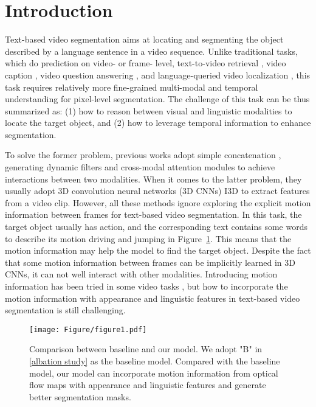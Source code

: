 \documentclass[10pt,twocolumn,letterpaper]{article}
\begin{document}
\section{Introduction} \label{Introduction}
\vspace{-3mm}
Text-based video segmentation aims at locating and segmenting the object described by a language sentence in a video sequence. Unlike traditional tasks, which do prediction on video- or frame- level, \eg text-to-video retrieval \cite{xu2016msr, krishna2017dense, rohrbach2015dataset}, video caption \cite{zhou2018towards, li2016tgif}, video question answering \cite{xu2017video, jang2017tgif}, and language-queried video localization \cite{anne2017localizing,zhang2021natural}, this task requires relatively more fine-grained multi-modal and temporal understanding for pixel-level segmentation. The challenge of this task can be thus summarized as: (1) how to reason between visual and linguistic modalities to locate the target object, and (2) how to leverage temporal information to enhance segmentation. 


To solve the former problem, previous works adopt simple concatenation \cite{hu2016segmentation}, generating dynamic filters \cite{gavrilyuk2018actor, wang2020context} and cross-modal attention modules \cite{hui2021collaborative, wang2019asymmetric} to achieve interactions between two modalities. When it comes to the latter problem, they usually adopt 3D convolution neural networks (3D CNNs) \eg I3D \cite{carreira2017quo} to extract features from a video clip. However, all these methods ignore exploring the explicit motion information between frames for text-based video segmentation. In this task, the target object usually has action, and the corresponding text contains some words to describe its motion \eg driving and jumping in Figure~\ref{compare}. This means that the motion information may help the model to find the target object. Despite the fact that some motion information between frames can be implicitly learned in 3D CNNs, it can not well interact with other modalities. Introducing motion information has been tried in some video tasks \cite{ji2021full, zhao2021weakly, chen2021mm, li2019motion, dutt2017fusionseg, zhou2020motion, yang2021self}, but how to incorporate the motion information with appearance and linguistic features in text-based video segmentation is still challenging.


\begin{figure}[!t]
    \centering
    \texttt{[image: Figure/figure1.pdf]}
    \caption{Comparison between baseline and our model. We adopt "B" in \ref{albation study} as the baseline model. Compared with the baseline model, our model can incorporate motion information from optical flow maps with appearance and linguistic features and generate better segmentation masks.}
    \label{compare}
    \vspace{-7mm}
\end{figure} 
\end{document}
